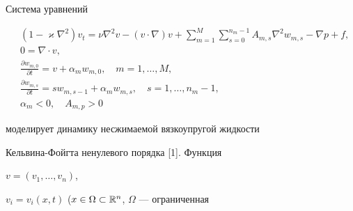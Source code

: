 \date{}







\pagestyle{plain} %













\maketitle


\label{begin}





Система уравнений


\begin{equation}


\begin{split}


&(1-\varkappa\nabla^2)v_t=\nu\nabla^2v-


(v\cdot\nabla)v+\sum^M_{m=1}\sum^{n_m-1}_{s=0}


A_{m,s}\nabla^2w_{m,s}-\nabla p+f,\\


&0=\nabla\cdot v,\\


&\frac{\partial w_{m,0}}{\partial t}=v+\alpha_mw_{m,0},


\quad m=1,\dotsc,M,\\


&\frac{\partial w_{m,s}}{\partial t}=sw_{m,s-1}+


\alpha_mw_{m,s},\quad s=1,\dotsc,n_m-1,\\


&\alpha_m<0,\quad A_{m,p}>0


\end{split}


\end{equation}


моделирует динамику несжимаемой вязкоупругой жидкости


Кельвина-Фойгта ненулевого порядка [1]. Функция


$v=(v_1,\dotsc,v_n)$,


$v_i=v_i(x,t)$ ($x\in\Omega\subset\Bbb R^n$, $\Omega$ --- ограниченная


